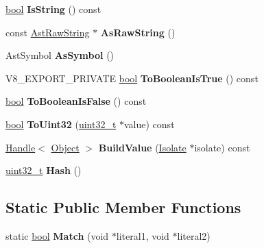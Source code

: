 \begin{DoxyCompactItemize}
\mbox{\label{classv8_1_1internal_1_1Literal_a3389c90376b97b59092d41d729515766}} 
\mbox{\hyperlink{classbool}{bool}} {\bfseries Is\+String} () const
\item 
\mbox{\label{classv8_1_1internal_1_1Literal_ae202102a45e067444444ac259f432377}} 
const \mbox{\hyperlink{classv8_1_1internal_1_1AstRawString}{Ast\+Raw\+String}} $\ast$ {\bfseries As\+Raw\+String} ()
\item 
\mbox{\label{classv8_1_1internal_1_1Literal_abf691d29797c926fe5cf35c9aabe69a6}} 
Ast\+Symbol {\bfseries As\+Symbol} ()
\item 
\mbox{\label{classv8_1_1internal_1_1Literal_ae3f085fa8fecbf6ed6c3a00ed8bb6239}} 
V8\+\_\+\+E\+X\+P\+O\+R\+T\+\_\+\+P\+R\+I\+V\+A\+TE \mbox{\hyperlink{classbool}{bool}} {\bfseries To\+Boolean\+Is\+True} () const
\item 
\mbox{\label{classv8_1_1internal_1_1Literal_ac644b187d1620e6f76d612d2f43bf97d}} 
\mbox{\hyperlink{classbool}{bool}} {\bfseries To\+Boolean\+Is\+False} () const
\item 
\mbox{\label{classv8_1_1internal_1_1Literal_a2320971a611642f4523ea38effae35da}} 
\mbox{\hyperlink{classbool}{bool}} {\bfseries To\+Uint32} (\mbox{\hyperlink{classuint32__t}{uint32\+\_\+t}} $\ast$value) const
\item 
\mbox{\label{classv8_1_1internal_1_1Literal_a0c7f65666c573ef056eedfab7b6c3fa1}} 
\mbox{\hyperlink{classv8_1_1internal_1_1Handle}{Handle}}$<$ \mbox{\hyperlink{classv8_1_1internal_1_1Object}{Object}} $>$ {\bfseries Build\+Value} (\mbox{\hyperlink{classv8_1_1internal_1_1Isolate}{Isolate}} $\ast$isolate) const
\item 
\mbox{\label{classv8_1_1internal_1_1Literal_a3d473e923ccc91b435159fde350974a8}} 
\mbox{\hyperlink{classuint32__t}{uint32\+\_\+t}} {\bfseries Hash} ()
\end{DoxyCompactItemize}
\subsection*{Static Public Member Functions}
\begin{DoxyCompactItemize}
\item 
\mbox{\label{classv8_1_1internal_1_1Literal_a1035dab7bb6d4fab33e9ebae88d93673}} 
static \mbox{\hyperlink{classbool}{bool}} {\bfseries Match} (void $\ast$literal1, void $\ast$literal2)
\end{DoxyCompactItemize}
